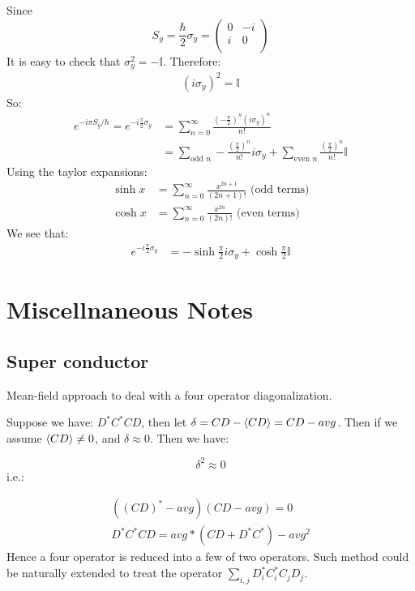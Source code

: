\documentclass{article}
\numberwithin{equation}{subsection} %
\theoremstyle{definition}
\begin{document}
    Since 
    $$S_y=\frac{\hbar}{2}\sigma_y=
        \left( \begin{array}{cc}
         0 & -i \\
         i & 0 \\
        \end{array} \right)$$
    It is easy to check that $\sigma_y^2 = - \mathbb{I}$. Therefore:
    \begin{align}
        (i\sigma_y)^2 = \mathbb{I}
    \end{align}
    So:
    \begin{align*}
        e^{-i\pi S_y/\hbar}=
        e^{-i\frac{\pi}{2}\sigma_y}&=\sum_{n=0}^{\infty}
         \frac{(-\frac{\pi}{2})^n(i\sigma_y)^n}{n!}\nonumber\\
         &=\sum_{\text{odd }n}-\frac{(\frac{\pi}{2})^n}{n!}i\sigma_y
           + \sum_{\text{even }n}\frac{(\frac{\pi}{2})^n}{n!}\mathbb{I}
    \end{align*}
    Using the taylor expansions:
    \begin{align}
        \sinh{x}&= \sum_{n=0}^{\infty}\frac{x^{2n+1}}{(2n+1)!}
        \text{ (odd terms)}\\
        \cosh{x}&= \sum_{n=0}^{\infty}\frac{x^{2n}}{(2n)!}
        \text{ (even terms)}
    \end{align}
    We see that:
    \begin{align}
        e^{-i\frac{\pi}{2}\sigma_y}&=
         - \sinh{\frac{\pi}{2}}i\sigma_y + \cosh{\frac{\pi}{2}}\mathbb{I}
    \end{align}
\section{Miscellnaneous Notes}
    \subsection{Super conductor}
    Mean-field approach to deal with a four operator diagonalization.
    
    Suppose we have: $D^*C^* CD$, then let $\delta = CD - \braket{CD} =
    CD - avg$. Then if we assume $\braket{CD}\neq 0$, and $\delta \approx 0$. Then we have:
    
    	$$ \delta^2 \approx 0 $$
    i.e.:
    
    \begin{align}
    	( (CD)^* - avg ) ( CD - avg ) = 0\\
    	D^*C^*CD = avg*(CD+D^*C^*) - avg^2
    \end{align}
    Hence a four operator is reduced into a few of two operators.
    Such method could be naturally extended to treat the operator
    $\sum_{i,j} D^*_i C^*_i C_j D_j$.
    
\end{document}
